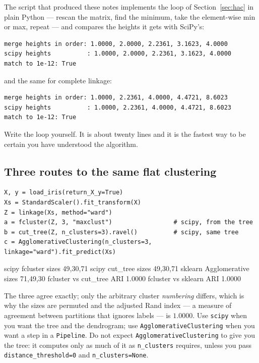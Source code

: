 \documentclass[11pt]{article}
\begin{document}
\begin{tryit}
The script that produced these notes implements the loop of
Section~\ref{sec:hac} in plain Python --- rescan the matrix, find the minimum,
take the element-wise min or max, repeat --- and compares the heights it gets
with SciPy's:
\begin{lstlisting}
merge heights in order: 1.0000, 2.0000, 2.2361, 3.1623, 4.0000
scipy heights          : 1.0000, 2.0000, 2.2361, 3.1623, 4.0000
match to 1e-12: True
\end{lstlisting}
and the same for complete linkage:
\begin{lstlisting}
merge heights in order: 1.0000, 2.2361, 4.0000, 4.4721, 8.6023
scipy heights          : 1.0000, 2.2361, 4.0000, 4.4721, 8.6023
match to 1e-12: True
\end{lstlisting}
Write the loop yourself. It is about twenty lines and it is the fastest way to
be certain you have understood the algorithm.
\end{tryit}

\subsection{Three routes to the same flat clustering}

\begin{lstlisting}
X, y = load_iris(return_X_y=True)
Xs = StandardScaler().fit_transform(X)
Z = linkage(Xs, method="ward")
a = fcluster(Z, 3, "maxclust")                 # scipy, from the tree
b = cut_tree(Z, n_clusters=3).ravel()          # scipy, same tree
c = AgglomerativeClustering(n_clusters=3, linkage="ward").fit_predict(Xs)
\end{lstlisting}
\begin{codeout}
  scipy fcluster        sizes 49,30,71
  scipy cut_tree        sizes 49,30,71
  sklearn Agglomerative sizes 71,49,30
  fcluster vs cut_tree  ARI 1.0000
  fcluster vs sklearn   ARI 1.0000
\end{codeout}

The three agree exactly; only the arbitrary cluster \emph{numbering} differs,
which is why the sizes are permuted and the adjusted Rand index --- a measure
of agreement between partitions that ignores labels --- is $1.0000$. Use
\texttt{scipy} when you want the tree and the dendrogram; use
\texttt{AgglomerativeClustering} when you want a step in a
\texttt{Pipeline}. Do not expect \texttt{AgglomerativeClustering} to give you
the tree: it computes only as much of it as \texttt{n\_clusters} requires,
unless you pass \texttt{distance\_threshold=0} and
\texttt{n\_clusters=None}.
\end{document}

